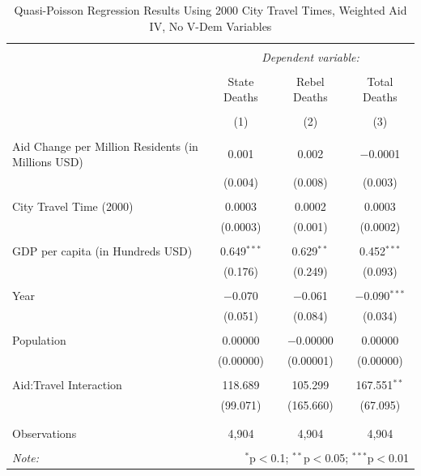 \documentclass[12pt, letterpaper]{article}
\begin{document}
\begin{table}[!htbp] \centering 
	\caption{Quasi-Poisson Regression Results Using 2000 City Travel Times, Weighted Aid IV, No V-Dem Variables} 
	\label{robustweighted2015} 
	\begin{tabular}{@{\extracolsep{5pt}}lccc} 
		\\[-1.8ex]\hline 
		\hline \\[-1.8ex] 
		& \multicolumn{3}{c}{\textit{Dependent variable:}} \\ 
		\cline{2-4} 
		\\[-1.8ex] & State Deaths & Rebel Deaths & Total Deaths \\ 
		\\[-1.8ex] & (1) & (2) & (3)\\ 
		\hline \\[-1.8ex] 
		Aid Change per Million Residents (in Millions USD) & 0.001 & 0.002 & $-$0.0001 \\ 
		& (0.004) & (0.008) & (0.003) \\ 
		& & & \\ 
		City Travel Time (2000) & 0.0003 & 0.0002 & 0.0003 \\ 
		& (0.0003) & (0.001) & (0.0002) \\ 
		& & & \\ 
		GDP per capita (in Hundreds USD) & 0.649$^{***}$ & 0.629$^{**}$ & 0.452$^{***}$ \\ 
		& (0.176) & (0.249) & (0.093) \\ 
		& & & \\ 
		Year & $-$0.070 & $-$0.061 & $-$0.090$^{***}$ \\ 
		& (0.051) & (0.084) & (0.034) \\ 
		& & & \\ 
		Population & 0.00000 & $-$0.00000 & 0.00000 \\ 
		& (0.00000) & (0.00001) & (0.00000) \\ 
		& & & \\ 
		Aid:Travel Interaction & 118.689 & 105.299 & 167.551$^{**}$ \\ 
		& (99.071) & (165.660) & (67.095) \\ 
		& & & \\ 
		\hline \\[-1.8ex] 
		Observations & 4,904 & 4,904 & 4,904 \\ 
		\hline 
		\hline \\[-1.8ex] 
		\textit{Note:}  & \multicolumn{3}{r}{$^{*}$p$<$0.1; $^{**}$p$<$0.05; $^{***}$p$<$0.01} \\ 
	\end{tabular} 
\end{table} 
\end{document}

